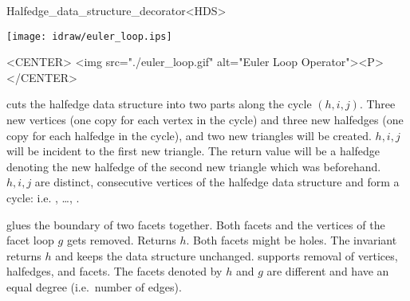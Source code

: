 \begin{ccClassTemplate}{Halfedge_data_structure_decorator<HDS>}
\begin{ccTexOnly}
    \begin{center}
      \parbox{0.636\textwidth}{%
          \texttt{[image: idraw/euler\_loop.ips]}%
      }
    \end{center}
\end{ccTexOnly}

\begin{ccHtmlOnly}
    <CENTER>
    <img src="./euler_loop.gif" alt="Euler Loop Operator"><P>
    </CENTER>
\end{ccHtmlOnly}

   {cuts the halfedge data structure into two parts along the cycle $(h,i,j)$.
    Three new vertices (one copy for each vertex in the cycle) and
    three new halfedges (one copy for each halfedge in the cycle), and
    two new triangles will be 
    created. $h,i,j$ will be incident to the first new triangle.
    The return value will be a halfedge denoting the
    new halfedge of the second new triangle which was 
    beforehand.
    \ccPrecond $h,i,j$ are distinct, consecutive vertices of the
    halfedge data structure and form a cycle: i.e. , \ldots, .}

   {glues the boundary of two facets together.
    Both facets and the vertices of the facet loop $g$ gets removed. 
    Returns $h$. Both facets might be holes.  
    The invariant  
    returns  $h$ and keeps the data structure unchanged.
    \ccPrecond {} supports removal of vertices, halfedges, and facets.
    The facets denoted by $h$ and $g$ are different and have an
    equal degree (i.e.~number of edges).} 




\ccGlue
{}
\ccGlue
{}
\ccGlue
{}


\end{ccClassTemplate}
